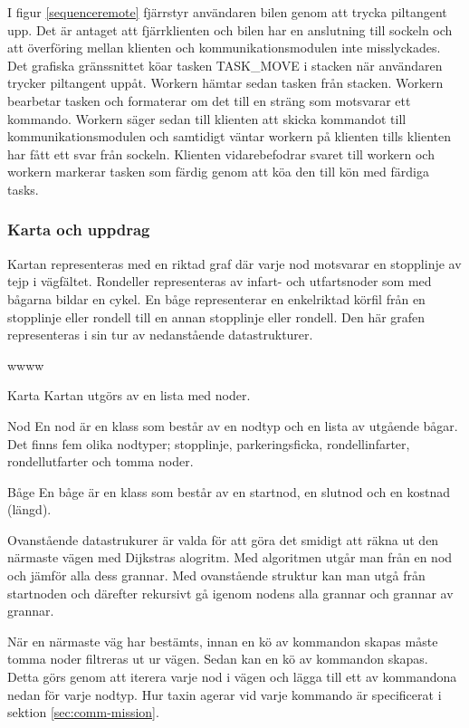 \documentclass[tekniskrapport/tech.tex]{subfiles}
\begin{document}
I figur \ref{sequenceremote} fjärrstyr användaren bilen genom att trycka
piltangent upp. Det är antaget att fjärrklienten och bilen har en anslutning
till sockeln och att överföring mellan klienten och kommunikationsmodulen inte
misslyckades. Det grafiska gränssnittet köar tasken TASK\_MOVE i stacken när
användaren trycker piltangent uppåt. Workern hämtar sedan tasken från stacken.
Workern bearbetar tasken och formaterar om det till en sträng som motsvarar ett
kommando. Workern säger sedan till klienten att skicka kommandot till
kommunikationsmodulen och samtidigt väntar workern på klienten tills klienten
har fått ett svar från sockeln. Klienten vidarebefodrar svaret till workern och
workern markerar tasken som färdig genom att köa den till kön med färdiga tasks.


\subsubsection{Karta och uppdrag}
\label{sec:mission}
Kartan representeras med en riktad graf där varje nod motsvarar en stopplinje
av tejp i vägfältet. Rondeller representeras av infart- och utfartsnoder som
med bågarna bildar en cykel. En båge representerar en enkelriktad körfil från
en stopplinje eller rondell till en annan stopplinje eller rondell. Den här
grafen representeras i sin tur av nedanstående datastrukturer.

\begin{labeling}{wwww}
    \item[Karta] Kartan utgörs av en lista med noder.

    \item[Nod] En nod är en klass som består av en nodtyp och en lista
        av utgående bågar. Det finns fem olika nodtyper; stopplinje,
        parkeringsficka, rondellinfarter, rondellutfarter och tomma noder. 

    \item[Båge] En båge är en klass som består av en startnod, en slutnod och
    en kostnad (längd).
        
\end{labeling}
Ovanstående datastrukurer är valda för att göra det smidigt att räkna ut den
närmaste vägen med Dijkstras alogritm. Med algoritmen utgår man från en nod och
jämför alla dess grannar. Med ovanstående struktur kan man utgå från startnoden
och därefter rekursivt gå igenom nodens alla grannar och grannar av grannar.

När en närmaste väg har bestämts, innan en kö av kommandon skapas måste tomma
noder filtreras ut ur vägen. Sedan kan en kö av kommandon skapas. Detta görs
genom att iterera varje nod i vägen och lägga till ett av kommandona nedan för
varje nodtyp. Hur taxin agerar vid varje kommando är specificerat i sektion
\ref{sec:comm-mission}.
\end{document}

